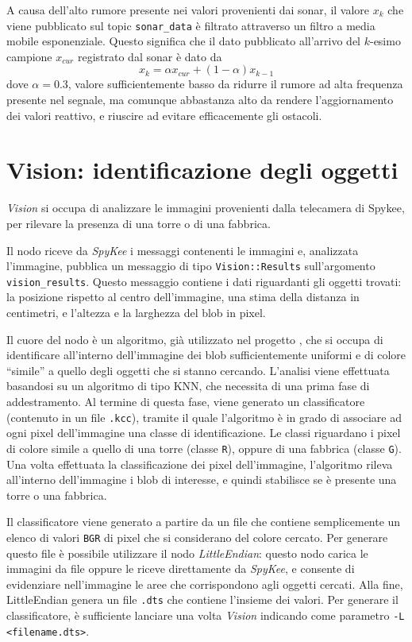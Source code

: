 A causa dell'alto rumore presente nei valori provenienti dai sonar, il valore $x_k$ che viene pubblicato sul topic \verb|sonar_data| è filtrato attraverso un filtro a media mobile esponenziale. Questo significa che il dato pubblicato all'arrivo del $k$-esimo campione $x_{cur}$ registrato dal sonar è dato da
  \[ x_k = \alpha x_{cur} + (1 - \alpha) x_{k-1} \]
dove $\alpha = 0.3$, valore sufficientemente basso da ridurre il rumore ad alta frequenza presente nel segnale, ma comunque abbastanza alto da rendere l'aggiornamento dei valori reattivo, e riuscire ad evitare efficacemente gli ostacoli.

\section{Vision: identificazione degli oggetti}

\emph{Vision} si occupa di analizzare le immagini provenienti dalla telecamera di Spykee, per rilevare la presenza di una torre o di una fabbrica. 

Il nodo riceve da \emph{SpyKee} i messaggi contenenti le immagini e, analizzata l'immagine, pubblica un messaggio di tipo \verb|Vision::Results| sull'argomento \verb|vision_results|. Questo messaggio contiene i dati riguardanti gli oggetti trovati: la posizione rispetto al centro dell'immagine, una stima della distanza in centimetri, e l'altezza e la larghezza del blob in pixel.

Il cuore del nodo è un algoritmo, già utilizzato nel progetto \cite{docmandelli}, che si occupa di identificare all'interno dell'immagine dei blob sufficientemente uniformi e di colore ``simile'' a quello degli oggetti che si stanno cercando. L'analisi viene effettuata basandosi su un algoritmo di tipo KNN, che necessita di una prima fase di addestramento. Al termine di questa fase, viene generato un classificatore (contenuto in un file \verb|.kcc|), tramite il quale l'algoritmo è in grado di associare ad ogni pixel dell'immagine una classe di identificazione. Le classi riguardano i pixel di colore simile a quello di una torre (classe \verb|R|), oppure di una fabbrica (classe \verb|G|). Una volta effettuata la classificazione dei pixel dell'immagine, l'algoritmo rileva all'interno dell'immagine i blob di interesse, e quindi stabilisce se è presente una torre o una fabbrica.

Il classificatore viene generato a partire da un file che contiene semplicemente un elenco di valori \verb|BGR| di pixel che si considerano del colore cercato. Per generare questo file è possibile utilizzare il nodo \emph{LittleEndian}: questo nodo carica le immagini da file oppure le riceve direttamente da \emph{SpyKee}, e consente di evidenziare nell'immagine le aree che corrispondono agli oggetti cercati. Alla fine, LittleEndian genera un file \verb|.dts| che contiene l'insieme dei valori. Per generare il classificatore, è sufficiente lanciare una volta \emph{Vision} indicando come parametro \verb|-L <filename.dts>|.

